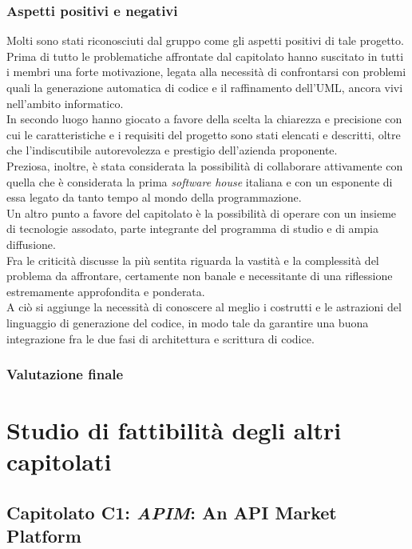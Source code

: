 		\subsubsection{Aspetti positivi e negativi}
		Molti sono stati riconosciuti dal gruppo come gli aspetti positivi di tale progetto.
		\\Prima di tutto le problematiche affrontate dal capitolato hanno suscitato in tutti i membri una forte motivazione, legata alla necessità di confrontarsi 
		con problemi quali la generazione automatica di codice e il raffinamento dell'UML, ancora vivi nell'ambito informatico.
		\\In secondo luogo hanno giocato 
		a favore della scelta la chiarezza e precisione con cui le caratteristiche e i requisiti del progetto sono stati elencati e descritti, oltre che l'indiscutibile 
		autorevolezza e prestigio dell'azienda proponente. 
		\\Preziosa, inoltre, è stata considerata la possibilità di collaborare attivamente con quella che è considerata 
		la prima \emph{software house} italiana e con un esponente di essa legato da tanto tempo al mondo della programmazione.
		\\Un altro punto a favore del capitolato è la possibilità di operare con un insieme di tecnologie assodato, parte integrante del programma di studio e di ampia diffusione.
		\\Fra le criticità discusse la più sentita riguarda la vastità e la complessità del problema da affrontare, certamente non banale e necessitante di una riflessione 
		estremamente approfondita e ponderata.
		\\A ciò si aggiunge la necessità di conoscere al meglio i costrutti e le astrazioni del linguaggio di generazione del codice, 
		in modo tale da garantire una buona integrazione fra le due fasi di architettura e scrittura di codice.
		\subsubsection{Valutazione finale}
	
\newpage

\section{Studio di fattibilità degli altri capitolati}
	\subsection{Capitolato C1: \emph{APIM}: An API Market Platform}
